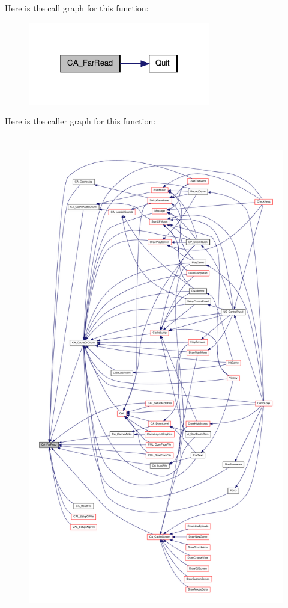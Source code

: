 Here is the call graph for this function:
\nopagebreak
\begin{figure}[H]
\begin{center}
\leavevmode
\includegraphics[width=226pt]{ID__CA_8C_a9d7ef0e3d4f10f25abd940094a4db437_cgraph}
\end{center}
\end{figure}




Here is the caller graph for this function:
\nopagebreak
\begin{figure}[H]
\begin{center}
\leavevmode
\includegraphics[height=600pt]{ID__CA_8C_a9d7ef0e3d4f10f25abd940094a4db437_icgraph}
\end{center}
\end{figure}


